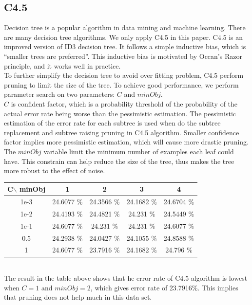 \documentclass[a4paper,11pt]{article}
\begin{document}
\subsection{C4.5}
Decision tree is a popular algorithm in data mining and machine learning. There are many decision tree algorithms. We only apply C4.5 in this paper. C4.5 is an improved version of ID3 decision tree. It follows a simple inductive bias, which is ``smaller trees are preferred''. This inductive bias is motivated by Occan's Razor principle, and it works well in practice.\\
To further simplify the decision tree to avoid over fitting problem, C4.5 perform pruning to limit the size of the tree. To achieve good performance, we perform parameter search on two parameters: $C$ and $minObj$. \\
$C$ is confident factor, which is a probability threshold of the probability of the actual error rate being worse than the pessimistic estimation\cite{Morgan.Kaufmann}. The pessimistic estimation of the error rate for each subtree is used when do the subtree replacement and subtree raising pruning in C4.5 algorithm. Smaller confidence factor implies more pessimistic estimation, which will cause more drastic pruning.\\
The $minObj$ variable limit the minimum number of examples each leaf could have. This constrain can help reduce the size of the tree, thus makes the tree more robust to the effect of noise.
\vspace{0.5cm}\\
\begin{tabular}{c|c c c c}
C$\backslash$ minObj	&1		&2		&3		&4\\
\hline \hline
1e-3 	&24.6077 \%	&24.3566 \%	&24.1682 \%	 &24.6704 \%\\
1e-2	&24.4193 \%	 &24.4821 \%	&24.231  \%	 &24.5449 \%\\
1e-1	&24.6077 \%	&24.231  \%	&24.231  \%	 &24.6077 \%\\
0.5 &24.2938 \%     &24.0427 \% &24.1055 \%  &24.8588 \%\\
1	&24.6077 \%	&23.7916 \%	&24.1682 \%	 &24.796  \%\\
\end{tabular}
\vspace{0.5cm}\\
The result in the table above shows that he error rate of C4.5 algorithm is lowest when $C=1$ and $minObj=2$, which gives error rate of 23.7916\%. This implies that pruning does not help much in this data set.\\
\end{document}
